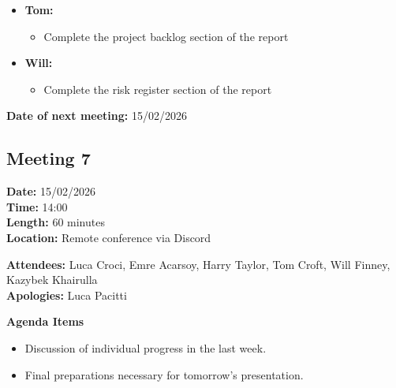 \documentclass[11pt]{article}
\begin{document}
\begin{itemize}
        \item \textbf{Tom:}
        \begin{itemize}
            \item Complete the project backlog section of the report
        \end{itemize}

        \item \textbf{Will:}
        \begin{itemize}
            \item Complete the risk register section of the report
        \end{itemize}
    \end{itemize}

    \textbf{Date of next meeting:} 15/02/2026



    \vspace{1.5\baselineskip}
    \subsection{Meeting 7}

    \textbf{Date:} 15/02/2026 \\
    \textbf{Time:} 14:00 \\
    \textbf{Length:} 60 minutes \\
    \textbf{Location:} Remote conference via Discord

    \textbf{Attendees:} Luca Croci, Emre Acarsoy, Harry Taylor, Tom Croft, Will Finney, Kazybek Khairulla \\
    \textbf{Apologies:} Luca Pacitti

    \textbf{Agenda Items}
    \begin{itemize}
        \item Discussion of individual progress in the last week.
        \item Final preparations necessary for tomorrow's presentation.
    \end{itemize}
\end{document}
